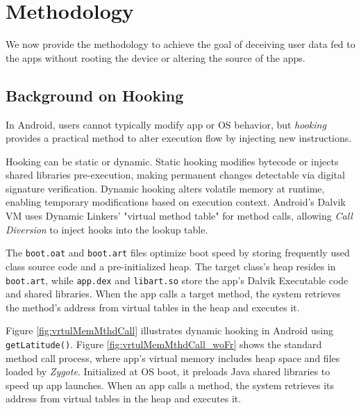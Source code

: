 \section{\framework{} Methodology}
\label{sec:methodology}

We now provide the methodology to achieve the goal of deceiving user data fed to the apps without rooting the device or altering the source of the apps.

\subsection{Background on Hooking}
In Android, users cannot typically modify app or OS behavior, but \textit{hooking} provides a practical method to alter execution flow by injecting new instructions.

Hooking can be static or dynamic. Static hooking modifies bytecode or injects shared libraries pre-execution, making permanent changes detectable via digital signature verification. Dynamic hooking alters volatile memory at runtime, enabling temporary modifications based on execution context. Android's Dalvik VM uses Dynamic Linkers' "virtual method table" for method calls, allowing \textit{Call Diversion} to inject hooks into the lookup table.

The \texttt{boot.oat} and \texttt{boot.art} files optimize boot speed by storing frequently used class source code and a pre-initialized heap. The target class's heap resides in \texttt{boot.art}, while \texttt{app.dex} and \texttt{libart.so} store the app's Dalvik Executable code and shared libraries. When the app calls a target method, the system retrieves the method's address from virtual tables in the heap and executes it.

Figure \ref{fig:vrtulMemMthdCall} illustrates dynamic hooking in Android using \texttt{getLatitude()}. Figure \ref{fig:vrtulMemMthdCall_woFr} shows the standard method call process, where app's virtual memory includes heap space and files loaded by \textit{Zygote}. Initialized at OS boot, it preloads Java shared libraries to speed up app launches. When an app calls a method, the system retrieves its address from virtual tables in the heap and executes it.

